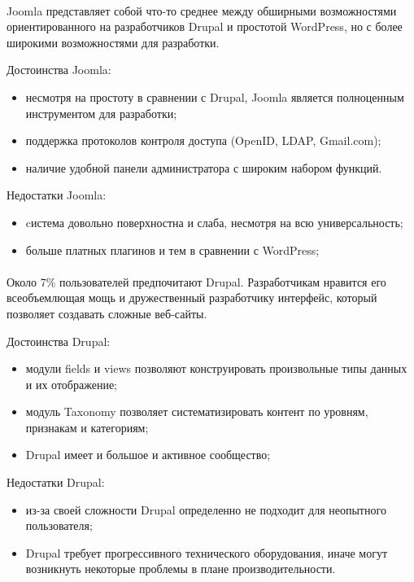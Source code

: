 \paragraph{} 
Joomla представляет собой что-то среднее между обширными возможностями ориентированного на
разработчиков Drupal и простотой WordPress, но с более широкими возможностями для разработки.

Достоинства Joomla:
\begin{itemize}
\item
  несмотря на простоту в сравнении с Drupal, Joomla является полноценным инструментом для разработки;
\item
  поддержка протоколов контроля доступа (OpenID, LDAP, Gmail.com);
\item
  наличие удобной панели администратора с широким набором функций.
\end{itemize}

Недостатки Joomla:
\begin{itemize}
\item
  cистема довольно поверхностна и слаба, несмотря на всю универсальность;
\item
  больше платных плагинов и тем в сравнении с WordPress;
\end{itemize}

\paragraph{}
Около 7\% пользователей предпочитают Drupal. Разработчикам нравится его всеобъемлющая мощь
и дружественный разработчику интерфейс, который позволяет создавать сложные веб-сайты.

Достоинства Drupal:
\begin{itemize}
\item
  модули fields и views позволяют конструировать произвольные типы данных и их отображение;
\item
  модуль Taxonomy позволяет систематизировать контент по уровням, признакам и категориям;
\item
  Drupal имеет и большое и активное сообщество;
\end{itemize}

Недостатки Drupal:
\begin{itemize}
\item 
  из-за своей сложности Drupal определенно не подходит для неопытного пользователя;
\item
  Drupal требует прогрессивного технического оборудования,
  иначе могут возникнуть некоторые проблемы в плане производительности.
\end{itemize}

